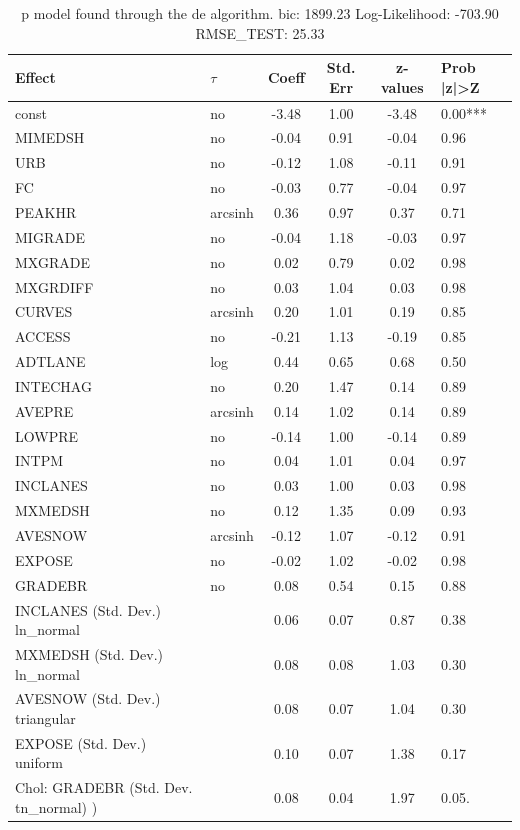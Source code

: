 \begin{table}
	\caption{p model found through the de algorithm. bic: 1899.23 Log-Likelihood: -703.90 RMSE_TEST: 25.33}
	\begin{center}
		\begin{tabular}{|l|l|c|c|c|l|}
			\hline
			Effect & $\tau$ & Coeff & Std. Err & z-values & Prob |z|>Z \\
			\hline
			const & no & -3.48 & 1.00 & -3.48 & 0.00*** \\
			\hline
			MIMEDSH & no & -0.04 & 0.91 & -0.04 & 0.96 \\
			\hline
			URB & no & -0.12 & 1.08 & -0.11 & 0.91 \\
			\hline
			FC & no & -0.03 & 0.77 & -0.04 & 0.97 \\
			\hline
			PEAKHR & arcsinh & 0.36 & 0.97 & 0.37 & 0.71 \\
			\hline
			MIGRADE & no & -0.04 & 1.18 & -0.03 & 0.97 \\
			\hline
			MXGRADE & no & 0.02 & 0.79 & 0.02 & 0.98 \\
			\hline
			MXGRDIFF & no & 0.03 & 1.04 & 0.03 & 0.98 \\
			\hline
			CURVES & arcsinh & 0.20 & 1.01 & 0.19 & 0.85 \\
			\hline
			ACCESS & no & -0.21 & 1.13 & -0.19 & 0.85 \\
			\hline
			ADTLANE & log & 0.44 & 0.65 & 0.68 & 0.50 \\
			\hline
			INTECHAG & no & 0.20 & 1.47 & 0.14 & 0.89 \\
			\hline
			AVEPRE & arcsinh & 0.14 & 1.02 & 0.14 & 0.89 \\
			\hline
			LOWPRE & no & -0.14 & 1.00 & -0.14 & 0.89 \\
			\hline
			INTPM & no & 0.04 & 1.01 & 0.04 & 0.97 \\
			\hline
			INCLANES & no & 0.03 & 1.00 & 0.03 & 0.98 \\
			\hline
			MXMEDSH & no & 0.12 & 1.35 & 0.09 & 0.93 \\
			\hline
			AVESNOW & arcsinh & -0.12 & 1.07 & -0.12 & 0.91 \\
			\hline
			EXPOSE & no & -0.02 & 1.02 & -0.02 & 0.98 \\
			\hline
			GRADEBR & no & 0.08 & 0.54 & 0.15 & 0.88 \\
			\hline
			INCLANES (Std. Dev.) ln_normal &  & 0.06 & 0.07 & 0.87 & 0.38 \\
			\hline
			MXMEDSH (Std. Dev.) ln_normal &  & 0.08 & 0.08 & 1.03 & 0.30 \\
			\hline
			AVESNOW (Std. Dev.) triangular &  & 0.08 & 0.07 & 1.04 & 0.30 \\
			\hline
			EXPOSE (Std. Dev.) uniform &  & 0.10 & 0.07 & 1.38 & 0.17 \\
			\hline
			 Chol: GRADEBR (Std. Dev. tn_normal) ) &  & 0.08 & 0.04 & 1.97 & 0.05. \\
			\hline
		\end{tabular}
	\end{center}
\end{table}